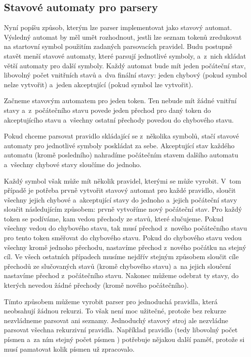 \documentclass[12pt]{article}
\def\code#1{\texttt{#1}}
\begin{document}
\subsection{Stavové automaty pro parsery}
Nyní popíšu způsob, kterým lze parser implementovat jako stavový automat.
Výsledný automat by měl umět rozhodnout, jestli lze seznam tokenů zredukovat na startovní symbol použitím zadaných parsovacích pravidel.
Budu postupně stavět menší stavové automaty, které parsují jednotlivé symboly, a~z~nich skládat větší automaty pro další symboly.
Každý automat bude mít jeden počáteční stav, libovolný počet vnitřních stavů a~dva finální stavy: jeden chybový (pokud symbol nelze vytvořit) a~jeden akceptující (pokud symbol lze vytvořit).

Začneme stavovým automatem pro jeden token.
Ten nebude mít žádné vnitřní stavy a~z~počátečního stavu povede jeden přechod pro daný token do akceptujícího stavu a~všechny ostatní přechody povedou do chybového stavu.

Pokud chceme parsovat pravidlo skládající se z~několika symbolů, stačí stavové automaty pro jednotlivé symboly poskládat za sebe.
Akceptující stav každého automatu (kromě posledního) nahradíme počátečním stavem dalšího automatu a~všechny chybové stavy sloučíme do jednoho.

Každý symbol však může mít několik pravidel, kterými se může vyrobit.
V~tom případě je potřeba prvně vytvořit stavový automat pro každé pravidlo, sloučit všechny jejich chybové a~akceptující stavy do jednoho a~jejich počáteční stavy sloučit následujícím způsobem:
prvně vytvoříme nový počáteční stav. Pro každý token se podíváme, kam vedou přechody ze stavů, které slučujeme.
Pokud všechny vedou do chybového stavu, tak musí přechod z~nového počátečního stavu pro tento token směřovat do chybového stavu.
Pokud do chybového stavu vedou všechny kromě jednoho přechodu, nastavíme přechod z~nového počátku na stejný cíl.
Ve všech ostatních případech musíme nejdřív stejným způsobem sloučit cíle přechodů ze slučovaných stavů (kromě chybového stavu) a~na jejich sloučení nastavíme přechod z~počátečního stavu.
Nakonec můžeme odebrat ty stavy, do kterých nevedou žádné přechody (kromě nového počátečního).

Tímto způsobem můžeme vyrobit parser pro jednoduchá pravidla, která neobsahují žádnou rekurzi. To však není moc užitečné, protože bez rekurze nezvládneme parsovat ani seznamy.
Jednoduchý stavový stroj ale nezvládne parsovat všechna rekurzivní pravidla.
Například pravidlo \uv{\code{x: \%empty | 'a' x 'b'}} (tedy libovolný počet písmen  a~za ním stejný počet písmen )
potřebuje nějakou další paměť, protože si musí pamatovat kolik písmen  už zpracovalo.
\end{document}
